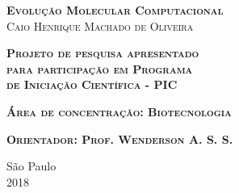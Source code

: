 \begin{center}
\textsc{\textbf{\LARGE Evolução Molecular Computacional }}
\\\vspace{2cm}
\textsc{\large Caio Henrique Machado de Oliveira }
\end{center}

\vspace{2cm}

\begin{flushright}
\textsc{\textbf{Projeto de pesquisa apresentado\\para participação em Programa\\de Iniciação Científica - PIC}}

\vspace{0.5cm}
\textsc{\textbf{Área de concentração: Biotecnologia}}

\vspace{0.5cm}
\textsc{\textbf{Orientador: Prof. Wenderson A. S.
S.}}
\end{flushright}

\vfill
\begin{center}
São Paulo \\ 2018
\end{center}
